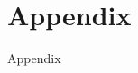 \documentclass[onesided]{article}\usepackage[]{graphicx}\usepackage[]{color}
\begin{document}
\clearpage
\newpage
{}
\setcounter{page}{1}
\printbibliography
\clearpage
\newpage



\clearpage



\begin{center}
\dotfill
{} \dotfill
\dotfill
{}
\end{center}

\clearpage






\setcounter{table}{0}
\renewcommand{\thetable}{A\arabic{table}}
\setcounter{figure}{0}
\renewcommand{\thefigure}{A\arabic{figure}}



\section{Appendix}
\setcounter{page}{1}

Appendix
\end{document}
